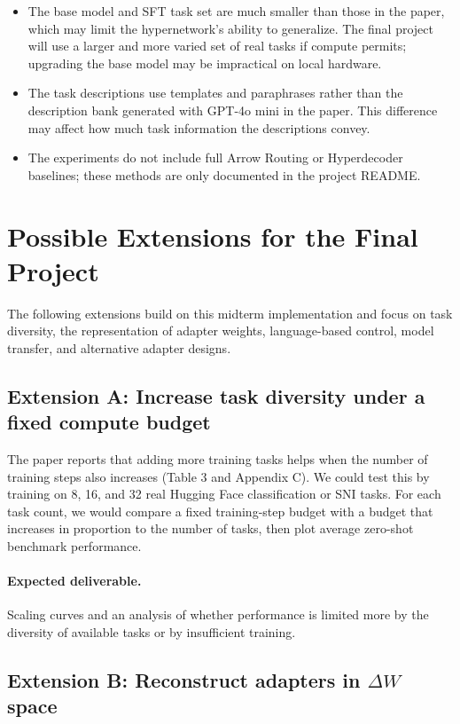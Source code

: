 \documentclass{article}
\begin{document}
\begin{itemize}
  \item The base model and SFT task set are much smaller than those in the paper, which may limit the hypernetwork's ability to generalize. The final project will use a larger and more varied set of real tasks if compute permits; upgrading the base model may be impractical on local hardware.
  \item The task descriptions use templates and paraphrases rather than the description bank generated with GPT-4o mini in the paper. This difference may affect how much task information the descriptions convey.
  \item The experiments do not include full Arrow Routing or Hyperdecoder baselines; these methods are only documented in the project README.
\end{itemize}

\section{Possible Extensions for the Final Project}

The following extensions build on this midterm implementation and focus on task diversity, the representation of adapter weights, language-based control, model transfer, and alternative adapter designs.

\subsection{Extension A: Increase task diversity under a fixed compute budget}

The paper reports that adding more training tasks helps when the number of training steps also increases (Table 3 and Appendix C). We could test this by training on 8, 16, and 32 real Hugging Face classification or SNI tasks. For each task count, we would compare a fixed training-step budget with a budget that increases in proportion to the number of tasks, then plot average zero-shot benchmark performance.

\paragraph{Expected deliverable.}
Scaling curves and an analysis of whether performance is limited more by the diversity of available tasks or by insufficient training.

\subsection{Extension B: Reconstruct adapters in $\Delta W$ space}
\end{document}
